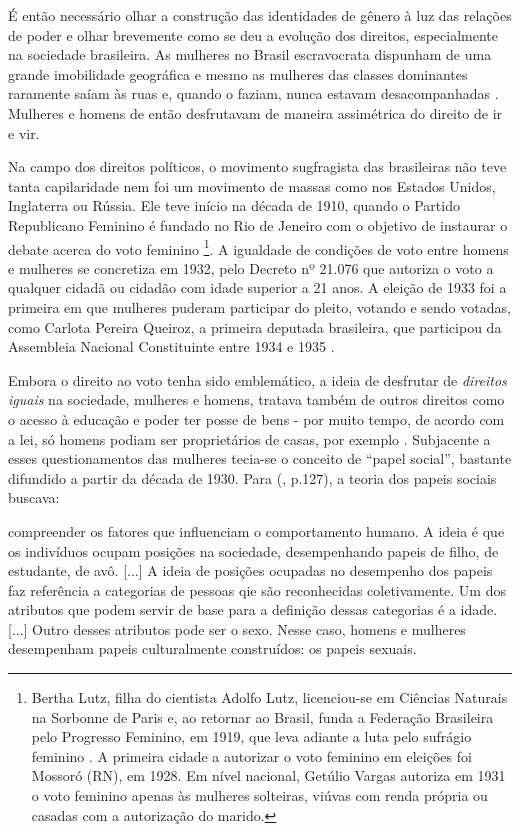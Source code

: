 É então necessário olhar a construção das identidades de gênero à luz das relações de poder e olhar brevemente como se deu a evolução dos direitos, especialmente na sociedade brasileira. As mulheres no Brasil escravocrata dispunham de uma grande imobilidade geográfica e mesmo as mulheres das classes dominantes raramente saíam às ruas e, quando o faziam, nunca estavam desacompanhadas \cite{SAFIOTTI1976}. Mulheres e homens de então desfrutavam de maneira assimétrica do direito de ir e vir.

Na campo dos direitos políticos, o movimento sugfragista das brasileiras não teve tanta capilaridade nem foi um movimento de massas como nos Estados Unidos, Inglaterra ou Rússia. Ele teve início na década de 1910, quando o Partido Republicano Feminino é fundado no Rio de Jeneiro com o objetivo de instaurar o debate acerca do voto feminino 
\footnote{
Bertha Lutz, filha do cientista Adolfo Lutz, licenciou-se em Ciências Naturais na Sorbonne de Paris e, ao retornar ao Brasil, funda a Federação Brasileira pelo Progresso Feminino, em 1919, que leva adiante a luta pelo sufrágio feminino \cite{PINSKY2003}. A primeira cidade a autorizar o voto feminino em eleições foi Mossoró (RN), em 1928. Em nível nacional, Getúlio Vargas autoriza em 1931 o voto feminino apenas às mulheres solteiras, viúvas com renda própria ou casadas com a autorização do marido.}.
A igualdade de condições de voto entre homens e mulheres se concretiza em 1932, pelo Decreto nº 21.076 que autoriza o voto a qualquer cidadã ou cidadão com idade superior a 21 anos. A eleição de 1933 foi a primeira em que mulheres puderam participar do pleito, votando e sendo votadas, como Carlota Pereira Queiroz, a primeira deputada brasileira, que participou da Assembleia Nacional Constituinte entre 1934 e 1935 \cite{TABAK1989}.

Embora o direito ao voto tenha sido emblemático, a ideia de desfrutar de \emph{direitos iguais} na sociedade, mulheres e homens, tratava também de outros direitos como o acesso à educação e poder ter posse de bens - por muito tempo, de acordo com a lei, só homens podiam ser proprietários de casas, por exemplo \cite{PISCITELLI2009}. Subjacente a esses questionamentos das mulheres tecia-se o conceito de ``papel social'', bastante difundido a partir da década de 1930. Para  (\citeyear{PISCITELLI2009}, p.127), a teoria dos papeis sociais buscava:

\begin{citacao}
compreender os fatores que influenciam o comportamento humano. A ideia é que os indivíduos ocupam posições na sociedade, desempenhando papeis de filho, de estudante, de avô. [...] A ideia de posições ocupadas no desempenho dos papeis faz referência a categorias de pessoas qie são reconhecidas coletivamente. Um dos atributos que podem servir de base para a definição dessas categorias é a idade. [...] Outro desses atributos pode ser o sexo. Nesse caso, homens e mulheres desempenham papeis culturalmente construídos: os papeis sexuais.
\end{citacao}

